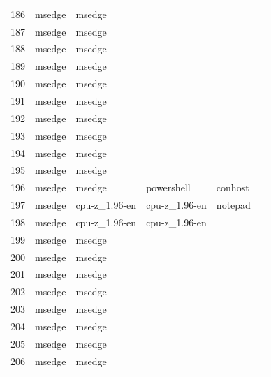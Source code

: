 \documentclass[a4paper,twoside,12pt]{book}
\begin{document}
\begin{appendices}
\begin{table}
\begin{tabular}{llllll}
		186 &  msedge &         msedge &                &                &                \\
		187 &  msedge &         msedge &                &                &                \\
		188 &  msedge &         msedge &                &                &                \\
		189 &  msedge &         msedge &                &                &                \\
		190 &  msedge &         msedge &                &                &                \\
		191 &  msedge &         msedge &                &                &                \\
		192 &  msedge &         msedge &                &                &                \\
		193 &  msedge &         msedge &                &                &                \\
		194 &  msedge &         msedge &                &                &                \\
		195 &  msedge &         msedge &                &                &                \\
		196 &  msedge &         msedge &     powershell &        conhost &                \\
		197 &  msedge &  cpu-z\_1.96-en &  cpu-z\_1.96-en &        notepad &                \\
		198 &  msedge &  cpu-z\_1.96-en &  cpu-z\_1.96-en &                &                \\
		199 &  msedge &         msedge &                &                &                \\
		200 &  msedge &         msedge &                &                &                \\
		201 &  msedge &         msedge &                &                &                \\
		202 &  msedge &         msedge &                &                &                \\
		203 &  msedge &         msedge &                &                &                \\
		204 &  msedge &         msedge &                &                &                \\
		205 &  msedge &         msedge &                &                &                \\
		206 &  msedge &         msedge &                &                &                \\

\end{tabular}
\end{table}
\end{appendices}
\end{document}
